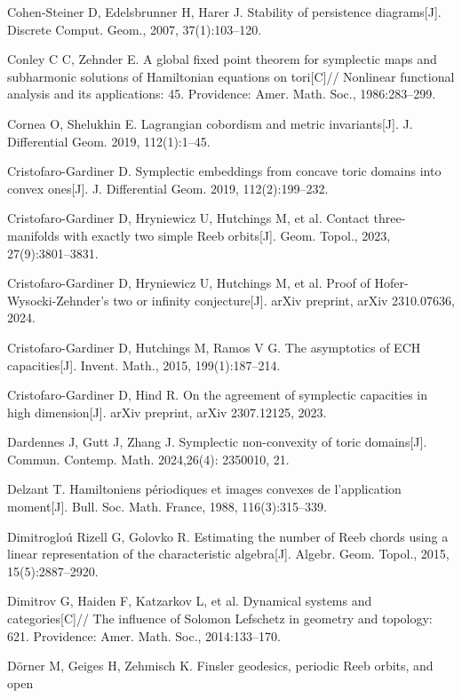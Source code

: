 \begin{enumerate}[label={[\arabic*]},leftmargin=3.2em,itemsep=2pt,parsep=0pt]
  \item Cohen-Steiner D, Edelsbrunner H, Harer J. Stability of persistence diagrams[J].
        Discrete Comput. Geom., 2007, 37(1):103--120.
  \item Conley C C, Zehnder E. A global fixed point theorem for symplectic maps and
        subharmonic solutions of Hamiltonian equations on tori[C]// Nonlinear functional
        analysis and its applications: 45. Providence: Amer. Math. Soc., 1986:283--299.
  \item Cornea O, Shelukhin E. Lagrangian cobordism and metric invariants[J].
        J. Differential Geom. 2019, 112(1):1--45.
  \item Cristofaro-Gardiner D. Symplectic embeddings from concave toric domains into convex
        ones[J]. J. Differential Geom. 2019, 112(2):199--232.
  \item Cristofaro-Gardiner D, Hryniewicz U, Hutchings M, et al. Contact three-manifolds
        with exactly two simple Reeb orbits[J]. Geom. Topol., 2023, 27(9):3801--3831.
  \item Cristofaro-Gardiner D, Hryniewicz U, Hutchings M, et al. Proof of
        Hofer-Wysocki-Zehnder's two or infinity conjecture[J]. arXiv preprint,
        arXiv 2310.07636, 2024.
  \item Cristofaro-Gardiner D, Hutchings M, Ramos V G. The asymptotics of ECH
        capacities[J]. Invent. Math., 2015, 199(1):187--214.
  \item Cristofaro-Gardiner D, Hind R. On the agreement of symplectic capacities in high
        dimension[J]. arXiv preprint, arXiv 2307.12125, 2023.
  \item Dardennes J, Gutt J, Zhang J. Symplectic non-convexity of toric domains[J].
        Commun. Contemp. Math. 2024,26(4): 2350010, 21.
  \item Delzant T. Hamiltoniens périodiques et images convexes de l'application moment[J].
        Bull. Soc. Math. France, 1988, 116(3):315--339.
  \item Dimitrogloú Rizell G, Golovko R. Estimating the number of Reeb chords using a
        linear representation of the characteristic algebra[J]. Algebr. Geom. Topol., 2015,
        15(5):2887--2920.
  \item Dimitrov G, Haiden F, Katzarkov L, et al. Dynamical systems and categories[C]// The
        influence of Solomon Lefschetz in geometry and topology: 621. Providence:
        Amer. Math. Soc., 2014:133--170.
  \item Dörner M, Geiges H, Zehmisch K. Finsler geodesics, periodic Reeb orbits, and open

\end{enumerate}
